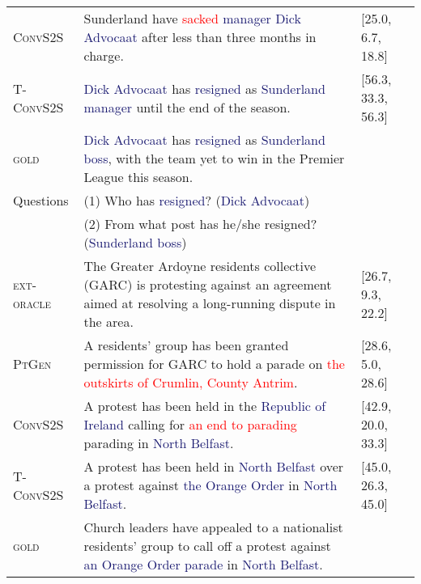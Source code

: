 \documentclass[11pt,a4paper]{article}
\begin{document}
\begin{table*}[t!]
{\begin{tabular}{l p{10.5cm} l}
      {\textsc{ConvS2S}} &Sunderland have \textcolor{red}{sacked} \textcolor{midnightblue}{manager} \textcolor{midnightblue}{Dick Advocaat} after less than three months in charge. &[25.0, 6.7, 18.8] \\

      {\textsc{T-ConvS2S}}& \textcolor{midnightblue}{Dick Advocaat} has \textcolor{midnightblue}{resigned} as \textcolor{midnightblue}{Sunderland manager} until the end of the season.& [56.3, 33.3, 56.3] \\
      
      {\textsc{gold}} &\textcolor{midnightblue}{Dick Advocaat} has \textcolor{midnightblue}{resigned} as \textcolor{midnightblue}{Sunderland boss}, with the team yet to win in the Premier League this season. \\
      
      Questions& (1) {Who has \textcolor{midnightblue}{resigned}?}
      (\textcolor{midnightblue}{Dick Advocaat}) \\& (2) {From what post has he/she resigned?} (\textcolor{midnightblue}{Sunderland boss}) \\
            
      \hline
      
{\textsc{ext-oracle}}& The Greater Ardoyne residents collective (GARC) is protesting against an agreement aimed at resolving a long-running dispute in the area. &[26.7, 9.3, 22.2]  \\

      {\textsc{PtGen}} &A residents' group has been granted permission for GARC to hold a parade on \textcolor{red}{the outskirts of Crumlin, County Antrim}. &[28.6, 5.0, 28.6] \\

      {\textsc{ConvS2S}} &A protest has been held in the \textcolor{midnightblue}{Republic of Ireland} calling for \textcolor{red}{an end to parading} parading in \textcolor{midnightblue}{North Belfast}. &[42.9, 20.0, 33.3] \\

      {\textsc{T-ConvS2S}}& A protest has been held in \textcolor{midnightblue}{North Belfast} over a protest against \textcolor{midnightblue}{the Orange Order} in \textcolor{midnightblue}{North Belfast}.& [45.0, 26.3, 45.0] \\

      {\textsc{gold}} &Church leaders have appealed to a nationalist residents' group to call off a protest against \textcolor{midnightblue}{an Orange Order parade} in \textcolor{midnightblue}{North Belfast}. \\


\end{tabular}}
\end{table*}
\end{document}
